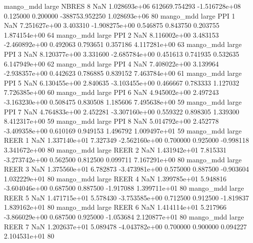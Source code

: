         mango_mdd      large    NBRES                 8                  NaN 1.028693e+06 612669.754293 -1.516728e+08 0.125000 0.200000 -388753.952250 1.028693e+06 80
        mango_mdd      large      PPI                 1                  NaN 7.251627e+00      3.403310 -1.908275e+00 0.546875 0.843750       0.203755 1.874154e+00 64
        mango_mdd      large      PPI                 2                  NaN 8.116002e+00      3.483153 -2.460892e+00 0.492063 0.793651       0.357186 4.117281e+00 63
        mango_mdd      large      PPI                 3                  NaN 8.120377e+00      3.331600 -2.685784e+00 0.451613 0.741935       0.532635 6.147949e+00 62
        mango_mdd      large      PPI                 4                  NaN 7.408022e+00      3.139964 -2.938357e+00 0.442623 0.786885       0.839152 7.463784e+00 61
        mango_mdd      large      PPI                 5                  NaN 6.130455e+00      2.840635 -3.103455e+00 0.466667 0.783333       1.127032 7.726385e+00 60
        mango_mdd      large      PPI                 6                  NaN 4.945002e+00      2.497243 -3.163230e+00 0.508475 0.830508       1.185606 7.495638e+00 59
        mango_mdd      large      PPI                 7                  NaN 4.764833e+00      2.452281 -3.307160e+00 0.559322 0.898305       1.339300 8.412317e+00 59
        mango_mdd      large      PPI                 8                  NaN 5.014792e+00      2.452778 -3.409358e+00 0.610169 0.949153       1.496792 1.009497e+01 59
        mango_mdd      large     REER                 1                  NaN 1.337140e+01      7.327349 -2.562160e+00 0.700000 0.925000      -0.998118 3.341672e+00 80
        mango_mdd      large     REER                 2                  NaN 1.431942e+01      7.815331 -3.273742e+00 0.562500 0.812500       0.099711 7.167291e+00 80
        mango_mdd      large     REER                 3                  NaN 1.375560e+01      6.782873 -3.473981e+00 0.575000 0.887500      -0.903604 1.032229e+01 80
        mango_mdd      large     REER                 4                  NaN 1.399785e+01      5.948816 -3.604046e+00 0.687500 0.887500      -1.917088 1.399711e+01 80
        mango_mdd      large     REER                 5                  NaN 1.471715e+01      5.578430 -3.753585e+00 0.712500 0.912500      -1.819837 1.839162e+01 80
        mango_mdd      large     REER                 6                  NaN 1.414114e+01      5.217966 -3.866029e+00 0.687500 0.925000      -1.053684 2.120877e+01 80
        mango_mdd      large     REER                 7                  NaN 1.202637e+01      5.089478 -4.043782e+00 0.700000 0.900000       0.094227 2.104531e+01 80
